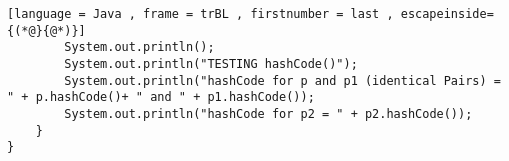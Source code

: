 \begin{enumerate}[label=(\alph*),align=left, wide, labelwidth=!, labelindent=0pt]
\begin{lstlisting}[language = Java , frame = trBL , firstnumber = last , escapeinside={(*@}{@*)}]
        System.out.println();
        System.out.println("TESTING hashCode()");
        System.out.println("hashCode for p and p1 (identical Pairs) = " + p.hashCode()+ " and " + p1.hashCode());
        System.out.println("hashCode for p2 = " + p2.hashCode());
    }
}
 \end{lstlisting}


\end{enumerate}
  		

  	